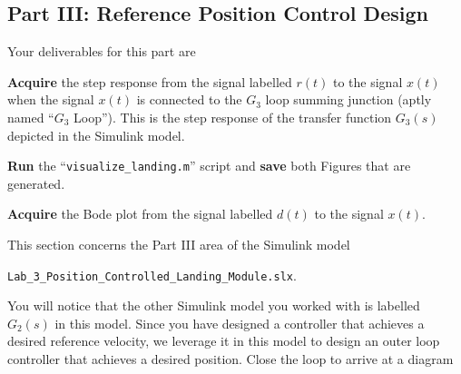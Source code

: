 \subsection{Part III: Reference Position Control Design}\label{Lab:3:Part:III}
Your deliverables for this part are
%
\begin{deliverable}[label={del:lab3:g3:1}]
   \textbf{Acquire} the step response from the signal labelled \(r(t)\) to the signal \(x(t)\) when the signal \(x(t)\) is connected to the \(G_3\) loop summing junction (aptly named ``\(G_3\) Loop'').
   This is the step response of the transfer function \(G_3(s)\) depicted in the Simulink model.
\end{deliverable}
%
\begin{deliverable}[label={del:lab3:g3:2}]
   \textbf{Run} the ``\texttt{visualize\_landing.m}'' script and \textbf{save} both Figures that are generated.
\end{deliverable}
%
\begin{deliverable}[label={del:lab3:g3:3}]
   \textbf{Acquire} the Bode plot from the signal labelled \(d(t)\) to the signal \(x(t).\)
\end{deliverable}
%
This section concerns the Part III area of the Simulink model
\begin{center}
  \texttt{Lab\_3\_Position\_Controlled\_Landing\_Module.slx}.
\end{center}
You will notice that the other Simulink model you worked with is labelled \(G_2(s)\) in this model.
Since you have designed a controller that achieves a desired reference velocity, we leverage it in this model to design an outer loop controller that achieves a desired position.
Close the loop to arrive at a diagram
%
\begin{center}
\end{center}
